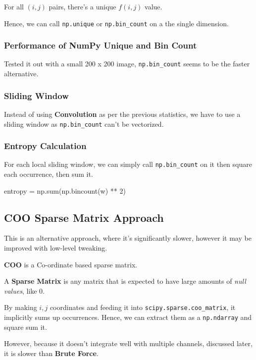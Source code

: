 \documentclass[article,oneside]{memoir}
\begin{document}
For all $(i, j)$ pairs, there's a unique $f(i, j)$ value.

Hence, we can call \verb+np.unique+ or \verb+np.bin_count+ on a the single dimension.

\subsubsection{Performance of NumPy Unique and Bin Count}

Tested it out with a small 200 x 200 image, \verb+np.bin_count+ seems to be the faster alternative.

\subsubsection{Sliding Window}

Instead of using \textbf{Convolution} as per the previous statistics, we have to use a sliding window as \verb+np.bin_count+ can't be vectorized.

\subsubsection{Entropy Calculation}

For each local sliding window, we can simply call \verb+np.bin_count+ on it then square each occurrence, then sum it.

\begin{python}
entropy = np.sum(np.bincount(w) ** 2)
\end{python}

\subsection{COO Sparse Matrix Approach}

This is an alternative approach, where it's significantly slower, however it may be improved with low-level tweaking.

\textbf{COO} is a Co-ordinate based sparse matrix.

A \textbf{Sparse Matrix} is any matrix that is expected to have large amounts of \textit{null values}, like 0.

By making $i, j$ coordinates and feeding it into \verb+scipy.sparse.coo_matrix+, it implicitly sums up occurrences. Hence, we can extract them as a \verb+np.ndarray+ and square sum it.

However, because it doesn't integrate well with multiple channels, discussed later, it is slower than \textbf{Brute Force}.
\end{document}
